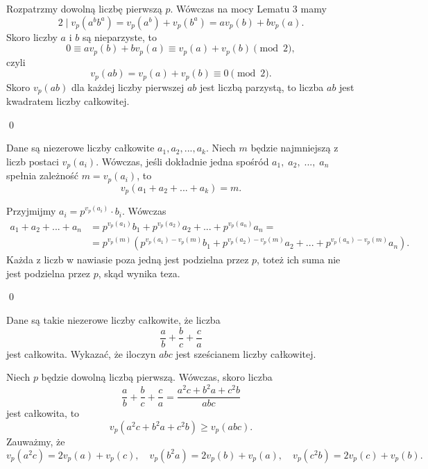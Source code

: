 \vspace{5px}


\noindent
Rozpatrzmy dowolną liczbę pierwszą $p$. Wówczas na mocy Lematu $3$ mamy
\[
	2 \mid v_p(a^bb^a) = v_p(a^b) + v_p(b^a) = av_p(b) + bv_p(a).
\]
Skoro liczby $a$ i $b$ są nieparzyste, to
\[
	0 \equiv av_p(b) + bv_p(a) \equiv v_p(a) + v_p(b) \pmod{2},
\]
czyli
\[
	v_p(ab) = v_p(a) + v_p(b) \equiv 0 \pmod{2}.
\]
Skoro $v_p(ab)$ dla każdej liczby pierwszej $ab$ jest liczbą parzystą, to liczba $ab$ jest kwadratem liczby całkowitej.

\qed


\noindent
Dane są niezerowe liczby całkowite $a_1, a_2, ..., a_k$. Niech $m$ będzie najmniejszą z liczb postaci $v_p(a_i)$. Wówczas, jeśli dokładnie jedna spośród $a_1, \; a_2, \; ..., \; a_n$ spełnia zależność $m = v_p(a_i)$, to
\[
	v_p(a_1 + a_2 + ... + a_k) = m.
\]

\vspace{5px}


\noindent
Przyjmijmy $a_i = p^{v_p(a_i)} \cdot b_i$. Wówczas
\begin{align*}
	a_1 + a_2 + ... + a_n &= p^{v_p(a_1)}b_1 + p^{v_p(a_2)}a_2 + ... + p^{v_p(a_n)}a_n = \\
	&= p^{v_p(m)}\left(p^{v_p(a_1) - v_p(m)}b_1 + p^{v_p(a_2) - v_p(m)}a_2 + ... + p^{v_p(a_n) - v_p(m)}a_n\right).
\end{align*}
Każda z liczb w nawiasie poza jedną jest podzielna przez $p$, toteż ich suma nie jest podzielna przez $p$, skąd wynika teza.

\qed


\noindent
Dane są takie niezerowe liczby całkowite, że liczba
\[
	\frac{a}{b} + \frac{b}{c} + \frac{c}{a}
\]
jest całkowita. Wykazać, że iloczyn $abc$ jest sześcianem liczby całkowitej.

\vspace{5px}


\noindent
Niech $p$ będzie dowolną liczbą pierwszą. Wówczas, skoro liczba
\[
	\frac{a}{b} + \frac{b}{c} + \frac{c}{a} = \frac{a^2c + b^2a + c^2b}{abc}
\]
jest całkowita, to
\[
	v_p(a^2c + b^2a + c^2b) \geqslant v_p(abc).
\]
Zauważmy, że
\[
	v_p(a^2c) = 2v_p(a) + v_p(c), \quad v_p(b^2a) = 2v_p(b) + v_p(a), \quad v_p(c^2b) = 2v_p(c) + v_p(b).
\]

